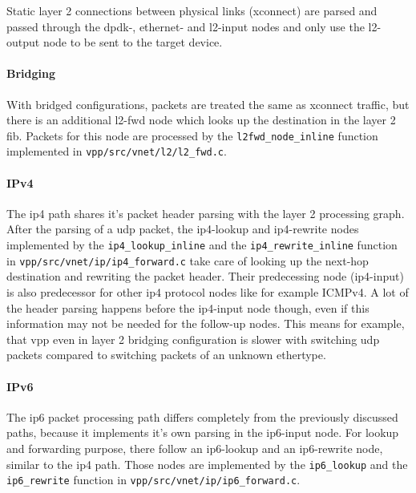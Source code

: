Static layer 2 connections between physical links (xconnect) are
parsed and passed through the dpdk-, ethernet- and l2-input nodes and
only use the l2-output node to be sent to the target device.

\paragraph{Bridging}

With bridged configurations, packets are treated the same as xconnect
traffic, but there is an additional l2-fwd node which looks up the
destination in the layer 2 \Ac{fib}. Packets for this node are
processed by the \lstinline|l2fwd_node_inline| function implemented in
\lstinline|vpp/src/vnet/l2/l2_fwd.c|.

\paragraph{IPv4}
\label{sec:headerparsing} 

The \Ac{ip4} path shares it's packet header parsing with the layer 2
processing graph. After the parsing of a \Ac{udp} packet, the
ip4-lookup and ip4-rewrite nodes implemented by the
\lstinline|ip4_lookup_inline| and the \lstinline|ip4_rewrite_inline|
function in \lstinline|vpp/src/vnet/ip/ip4_forward.c| take care of
looking up the next-hop destination and rewriting the packet header.
Their predecessing node (ip4-input) is also predecessor for other ip4
protocol nodes like for example ICMPv4. A lot of the header parsing
happens before the ip4-input node though, even if this information may
not be needed for the follow-up nodes. This means for example, that
\Ac{vpp} even in layer 2 bridging configuration is slower with
switching \Ac{udp} packets compared to switching packets of an unknown
ethertype.

\paragraph{IPv6}

The ip6 packet processing path differs completely from the previously
discussed paths, because it implements it's own parsing in the
ip6-input node. For lookup and forwarding purpose, there follow an
ip6-lookup and an ip6-rewrite node, similar to the \Ac{ip4} path.
Those nodes are implemented by the \lstinline|ip6_lookup| and the
\lstinline|ip6_rewrite| function in
\lstinline|vpp/src/vnet/ip/ip6_forward.c|.

